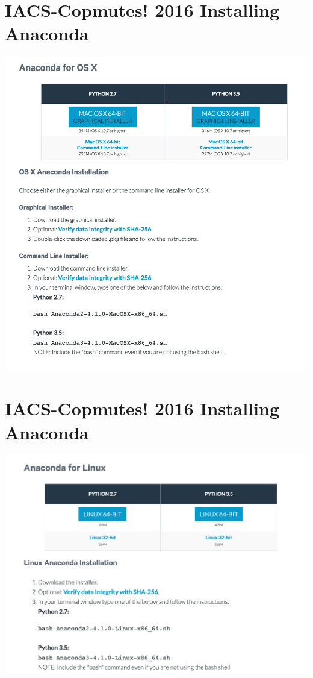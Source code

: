 \documentclass[]{article}
\begin{document}
\section*{IACS-Copmutes! 2016 Installing Anaconda}
\begin{centering}
    \centerline{\includegraphics[scale=0.7]{mac.png}}
\end{centering}
\section*{IACS-Copmutes! 2016 Installing Anaconda}
\begin{centering}
    \centerline{\includegraphics[scale=0.5]{linux.png}}
\end{centering}
\end{document}
